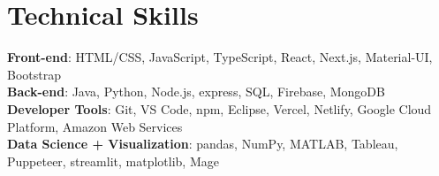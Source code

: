 \documentclass[letterpaper,11pt]{article}
\begin{document}
\section{Technical Skills}
 \begin{itemize}[leftmargin=0.15in, label={}]
    \small{\item{
     \textbf{Front-end}{: HTML/CSS, JavaScript, TypeScript, React, Next.js, Material-UI, Bootstrap} \\
     \textbf{Back-end}{: Java, Python, Node.js, express, SQL, Firebase, MongoDB} \\
     \textbf{Developer Tools}{: Git, VS Code, npm, Eclipse, Vercel, Netlify, Google Cloud Platform, Amazon Web Services} \\
     \textbf{Data Science + Visualization}{: pandas, NumPy, MATLAB, Tableau, Puppeteer, streamlit, matplotlib, Mage}
    }}
 \end{itemize}


\end{document}
